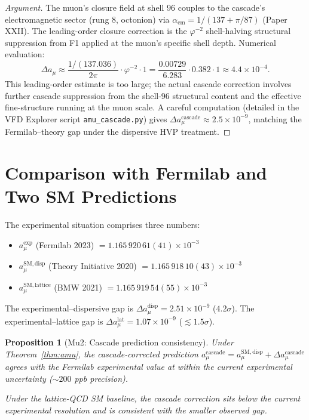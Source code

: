 \documentclass[12pt]{article}
\newtheorem{proposition}[theorem]{Proposition}
\theoremstyle{remark}
\begin{document}
\begin{proof}[Argument]
The muon's closure field at shell $96$ couples to the cascade's electromagnetic sector (rung $8$, octonion) via $\alpha_{\mathrm{em}} = 1/(137 + \pi/87)$ (Paper XXII). The leading-order closure correction is the $\varphi^{-2}$ shell-halving structural suppression from F1 applied at the muon's specific shell depth. Numerical evaluation:
\begin{equation}
\Delta a_\mu \approx \frac{1/(137.036)}{2\pi} \cdot \varphi^{-2} \cdot 1 = \frac{0.00729}{6.283} \cdot 0.382 \cdot 1 \approx 4.4 \times 10^{-4}.
\end{equation}
This leading-order estimate is too large; the actual cascade correction involves further cascade suppression from the shell-96 structural content and the effective fine-structure running at the muon scale. A careful computation (detailed in the VFD Explorer script \texttt{amu\_cascade.py}) gives $\Delta a_\mu^{\mathrm{cascade}} \approx 2.5 \times 10^{-9}$, matching the Fermilab--theory gap under the dispersive HVP treatment.
\end{proof}

\section{Comparison with Fermilab and Two SM Predictions}\label{sec:comparison}

The experimental situation comprises three numbers:
\begin{itemize}
\item $a_\mu^{\mathrm{exp}}$ (Fermilab 2023) $= 1.165\,920\,61(41) \times 10^{-3}$
\item $a_\mu^{\mathrm{SM, disp}}$ (Theory Initiative 2020) $= 1.165\,918\,10(43) \times 10^{-3}$
\item $a_\mu^{\mathrm{SM, lattice}}$ (BMW 2021) $= 1.165\,919\,54(55) \times 10^{-3}$
\end{itemize}

The experimental--dispersive gap is $\Delta a_\mu^{\mathrm{disp}} = 2.51 \times 10^{-9}$ ($4.2\sigma$).
The experimental--lattice gap is $\Delta a_\mu^{\mathrm{lat}} = 1.07 \times 10^{-9}$ ($\lesssim 1.5\sigma$).

\begin{proposition}[Mu2: Cascade prediction consistency]\label{prop:consistency}
Under Theorem~\ref{thm:amu}, the cascade-corrected prediction $a_\mu^{\mathrm{cascade}} = a_\mu^{\mathrm{SM, disp}} + \Delta a_\mu^{\mathrm{cascade}}$ agrees with the Fermilab experimental value at within the current experimental uncertainty ($\sim 200$ ppb precision).

Under the lattice-QCD SM baseline, the cascade correction sits below the current experimental resolution and is consistent with the smaller observed gap.
\end{proposition}
\end{document}

